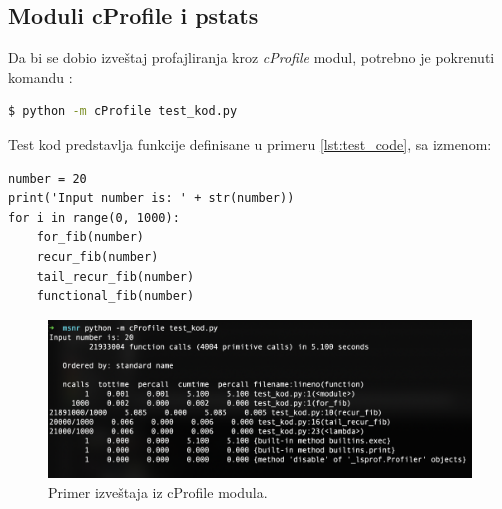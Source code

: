\documentclass[a4paper]{article}
\begin{document}
\subsection{Moduli cProfile i pstats}
Da bi se dobio izveštaj profajliranja kroz {\em cProfile} modul, potrebno je pokrenuti komandu \cite{cProfile}: 
\begin{lstlisting}[language=bash, belowskip=-\baselineskip, frame=single]
  $ python -m cProfile test_kod.py
\end{lstlisting}
Test kod predstavlja funkcije definisane u primeru \ref{lst:test_code}, sa izmenom:
\begin{lstlisting}[caption={Dodatak za testiranje {\em cProfile}.},frame=single, 
label=lbl:cmodule_test]
number = 20
print('Input number is: ' + str(number))
for i in range(0, 1000):
    for_fib(number)
    recur_fib(number)
    tail_recur_fib(number)
    functional_fib(number)
\end{lstlisting}
\begin{figure}[h!]
\begin{center}
\includegraphics[scale=0.4]{MVJ_02_ProfajleriZaPython_ZecevicSmiljanicMilovanovicPopov/cProfile_without_import.png}
\end{center}
\caption{Primer izveštaja iz cProfile modula.}
\label{fig:cProfile_no_import}
\end{figure} 
\end{document}
